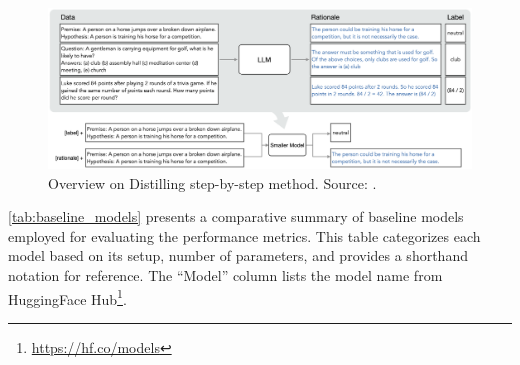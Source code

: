 \begin{figure}[hbt]
    \centering
    \includegraphics[width=0.99\linewidth]{figs/stepbystep.png}
    \caption[Overview on Distilling step-by-step method.]{Overview on Distilling step-by-step method. Source: \cite{stepbystep}.}
    \label{fig:stepbystep}
\end{figure}

\autoref{tab:baseline_models} presents a comparative summary of baseline models employed for evaluating the performance metrics. This table categorizes each model based on its setup, number of parameters, and provides a shorthand notation for reference. The ``Model'' column lists the model name from HuggingFace Hub\footnote{\url{https://hf.co/models}}.

\begin{table}[h]
    \centering
    \caption{Baseline Models}
    \label{tab:baseline_models}
\end{table}


